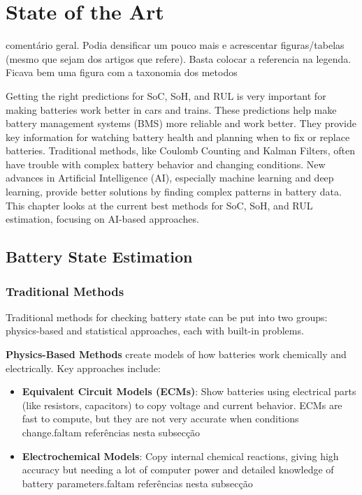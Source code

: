 \chapter{State of the Art}
\label{ch:stateoftheart}
\color{Red}comentário geral. Podia densificar um pouco mais e acrescentar figuras/tabelas (mesmo que sejam dos artigos que refere). Basta colocar a referencia na legenda. Ficava bem uma figura com a taxonomia  dos metodos\color{Black}

Getting the right predictions for SoC, SoH, and RUL is very important for making batteries work better in cars and trains. These predictions help make battery management systems (BMS) more reliable and work better. They provide key information for watching battery health and planning when to fix or replace batteries. Traditional methods, like Coulomb Counting and Kalman Filters, often have trouble with complex battery behavior and changing conditions. New advances in Artificial Intelligence (AI), especially machine learning and deep learning, provide better solutions by finding complex patterns in battery data. This chapter looks at the current best methods for SoC, SoH, and RUL estimation, focusing on AI-based approaches.

\section{Battery State Estimation}

\subsection{Traditional Methods}
\label{subsec:traditional_methods}
Traditional methods for checking battery state can be put into two groups: physics-based and statistical approaches, each with built-in problems.

\textbf{Physics-Based Methods} create models of how batteries work chemically and electrically. Key approaches include:
\begin{itemize}
    \item \textbf{Equivalent Circuit Models (ECMs)}: Show batteries using electrical parts (like resistors, capacitors) to copy voltage and current behavior. ECMs are fast to compute, but they are not very accurate when conditions change.\color{Red}faltam referências nesta subsecção\color{Black}
    \item \textbf{Electrochemical Models}: Copy internal chemical reactions, giving high accuracy but needing a lot of computer power and detailed knowledge of battery parameters.\color{Red}faltam referências nesta subsecção\color{Black}
\end{itemize}

